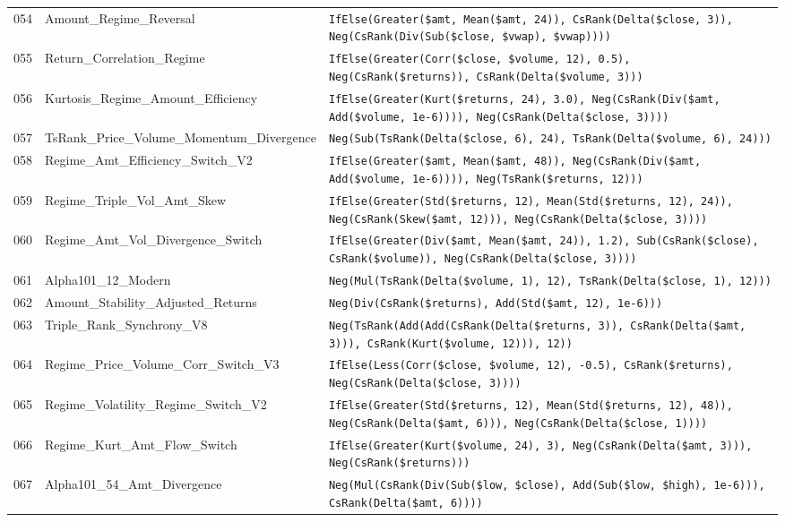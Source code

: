 \begin{longtable}{@{}llp{}@{}}
054 & Amount\_Regime\_Reversal & \texttt{IfElse(Greater(\$amt, Mean(\$amt, 24)), CsRank(Delta(\$close, 3)), Neg(CsRank(Div(Sub(\$close, \$vwap), \$vwap))))} \\
055 & Return\_Correlation\_Regime & \texttt{IfElse(Greater(Corr(\$close, \$volume, 12), 0.5), Neg(CsRank(\$returns)), CsRank(Delta(\$volume, 3)))} \\
056 & Kurtosis\_Regime\_Amount\_Efficiency & \texttt{IfElse(Greater(Kurt(\$returns, 24), 3.0), Neg(CsRank(Div(\$amt, Add(\$volume, 1e-6)))), Neg(CsRank(Delta(\$close, 3))))} \\
057 & TsRank\_Price\_Volume\_Momentum\_Divergence & \texttt{Neg(Sub(TsRank(Delta(\$close, 6), 24), TsRank(Delta(\$volume, 6), 24)))} \\
058 & Regime\_Amt\_Efficiency\_Switch\_V2 & \texttt{IfElse(Greater(\$amt, Mean(\$amt, 48)), Neg(CsRank(Div(\$amt, Add(\$volume, 1e-6)))), Neg(TsRank(\$returns, 12)))} \\
059 & Regime\_Triple\_Vol\_Amt\_Skew & \texttt{IfElse(Greater(Std(\$returns, 12), Mean(Std(\$returns, 12), 24)), Neg(CsRank(Skew(\$amt, 12))), Neg(CsRank(Delta(\$close, 3))))} \\
060 & Regime\_Amt\_Vol\_Divergence\_Switch & \texttt{IfElse(Greater(Div(\$amt, Mean(\$amt, 24)), 1.2), Sub(CsRank(\$close), CsRank(\$volume)), Neg(CsRank(Delta(\$close, 3))))} \\
061 & Alpha101\_12\_Modern & \texttt{Neg(Mul(TsRank(Delta(\$volume, 1), 12), TsRank(Delta(\$close, 1), 12)))} \\
062 & Amount\_Stability\_Adjusted\_Returns & \texttt{Neg(Div(CsRank(\$returns), Add(Std(\$amt, 12), 1e-6)))} \\
063 & Triple\_Rank\_Synchrony\_V8 & \texttt{Neg(TsRank(Add(Add(CsRank(Delta(\$returns, 3)), CsRank(Delta(\$amt, 3))), CsRank(Kurt(\$volume, 12))), 12))} \\
064 & Regime\_Price\_Volume\_Corr\_Switch\_V3 & \texttt{IfElse(Less(Corr(\$close, \$volume, 12), -0.5), CsRank(\$returns), Neg(CsRank(Delta(\$close, 3))))} \\
065 & Regime\_Volatility\_Regime\_Switch\_V2 & \texttt{IfElse(Greater(Std(\$returns, 12), Mean(Std(\$returns, 12), 48)), Neg(CsRank(Delta(\$amt, 6))), Neg(CsRank(Delta(\$close, 1))))} \\
066 & Regime\_Kurt\_Amt\_Flow\_Switch & \texttt{IfElse(Greater(Kurt(\$volume, 24), 3), Neg(CsRank(Delta(\$amt, 3))), Neg(CsRank(\$returns)))} \\
067 & Alpha101\_54\_Amt\_Divergence & \texttt{Neg(Mul(CsRank(Div(Sub(\$low, \$close), Add(Sub(\$low, \$high), 1e-6))), CsRank(Delta(\$amt, 6))))} \\

\end{longtable}
